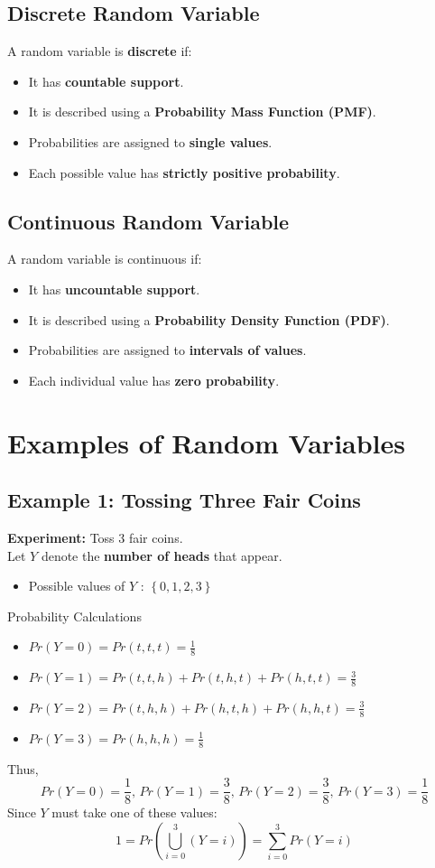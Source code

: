 \documentclass[11pt]{article}
\begin{document}
\subsection{Discrete Random Variable}
A random variable is \textbf{discrete} if:
\begin{itemize}
	\item It has \textbf{countable support}.
	\item It is described using a \textbf{Probability Mass Function (PMF)}.
	\item Probabilities are assigned to \textbf{single values}.
	\item Each possible value has \textbf{strictly positive probability}.
\end{itemize}
\subsection{Continuous Random Variable}
A random variable is continuous if:
\begin{itemize}
	\item It has \textbf{uncountable support}.
	\item It is described using a \textbf{Probability Density Function (PDF)}.
	\item Probabilities are assigned to \textbf{intervals of values}.
	\item Each individual value has \textbf{zero probability}.
\end{itemize}

\section{Examples of Random Variables}
\subsection*{Example 1: Tossing Three Fair Coins}
\textbf{Experiment:} Toss 3 fair coins.\\
Let $Y$ denote the \textbf{number of heads} that appear.
\begin{itemize}
	\item Possible values of $Y$ : $\left\{ 0, 1, 2, 3 \right\}$
\end{itemize}
Probability Calculations
\begin{itemize}
	\item $Pr(Y=0) = Pr(t, t, t) = \frac{1}{8}$
	\item $Pr(Y=1) = Pr(t, t, h) + Pr(t, h, t) + Pr(h, t, t) = \frac{3}{8}$
	\item $Pr(Y=2) = Pr(t, h, h) + Pr(h, t, h) + Pr(h, h, t) = \frac{3}{8}$
	\item $Pr(Y=3) = Pr(h, h, h) = \frac{1}{8}$
\end{itemize}
Thus,
$$Pr(Y=0) = \frac{1}{8},\,Pr(Y=1) = \frac{3}{8},\,Pr(Y=2) = \frac{3}{8},\,Pr(Y=3) = \frac{1}{8}$$
Since $Y$ must take one of these values:
$$1 = Pr\left( \bigcup_{i=0}^3(Y=i) \right) = \sum_{i=0}^{3}Pr(Y=i)$$
\end{document}
